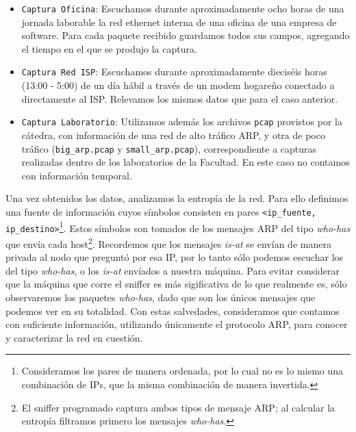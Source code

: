 \begin{itemize}
 \item \texttt{Captura Oficina}: Escuchamos durante aproximadamente ocho horas de una jornada laborable la red ethernet interna de una oficina de una empresa de software. Para cada paquete recibido guardamos todos sus campos, agregando el tiempo en el que se produjo la captura.
 
 \item \texttt{Captura Red ISP}: Escuchamos durante aproximadamente dieciséis horas (13:00 - 5:00) de un día hábil a través de un modem hogareño conectado a directamente al ISP. Relevamos los mismos datos que para el caso anterior.

 \item \texttt{Captura Laboratorio}: Utilizamos adem\'as los archivos \texttt{pcap} provistos por la c\'atedra, con informaci\'on de una red de alto tr\'afico ARP, y otra de poco tr\'afico (\texttt{big\_arp.pcap} y \texttt{small\_arp.pcap}), correspondiente a capturas realizadas dentro de los laboratorios de la Facultad. En este caso no contamos con información temporal.\\

\end{itemize}

Una vez obtenidos los datos, analizamos la entrop\'ia de la red. Para ello definimos una fuente de informaci\'on cuyos s\'imbolos consisten en pares \texttt{<ip\_fuente, ip\_destino>}\footnote{Consideramos los pares de manera ordenada, por lo cual no es lo mismo una combinaci\'on de IPs, que la misma combinaci\'on de manera invertida.}. Estos s\'imbolos son tomados de los mensajes ARP del tipo \emph{who-has} que env\'ia cada host\footnote{El sniffer programado captura ambos tipos de mensaje ARP; al calcular la entrop\'ia filtramos primero los mensajes \emph{who-has}.}. Recordemos que los mensajes \emph{is-at} se env\'ian de manera privada al nodo que pregunt\'o por esa IP, por lo tanto s\'olo podemos escuchar los del tipo \emph{who-has}, o los \emph{is-at} env\'iados a nuestra m\'aquina. Para evitar considerar que la m\'aquina que corre el sniffer es m\'as sigificativa de lo que realmente es, s\'olo observaremos los paquetes \emph{who-has}, dado que son los únicos mensajes que podemos ver en su totalidad. Con estas salvedades, consideramos que contamos con suficiente información, utilizando únicamente el protocolo ARP, para conocer y caracterizar la red en cuestión. \\

